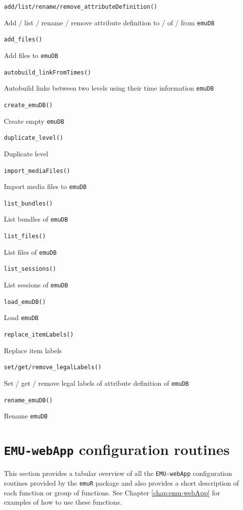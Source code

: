\documentclass[]{book}
\theoremstyle{definition}
\theoremstyle{definition}
\theoremstyle{definition}
\theoremstyle{remark}
\begin{document}
\texttt{add/list/rename/remove\_attributeDefinition()}

Add / list / rename / remove attribute definition to / of / from
\texttt{emuDB}

\texttt{add\_files()}

Add files to \texttt{emuDB}

\texttt{autobuild\_linkFromTimes()}

Autobuild links between two levels using their time information
\texttt{emuDB}

\texttt{create\_emuDB()}

Create empty \texttt{emuDB}

\texttt{duplicate\_level()}

Duplicate level

\texttt{import\_mediaFiles()}

Import media files to \texttt{emuDB}

\texttt{list\_bundles()}

List bundles of \texttt{emuDB}

\texttt{list\_files()}

List files of \texttt{emuDB}

\texttt{list\_sessions()}

List sessions of \texttt{emuDB}

\texttt{load\_emuDB()}

Load \texttt{emuDB}

\texttt{replace\_itemLabels()}

Replace item labels

\texttt{set/get/remove\_legalLabels()}

Set / get / remove legal labels of attribute definition of
\texttt{emuDB}

\texttt{rename\_emuDB()}

Rename \texttt{emuDB}

\hypertarget{sec:emuRpackageDetails-emuWebAppConfig}{%
\section{\texorpdfstring{\texttt{EMU-webApp} configuration
routines}{EMU-webApp configuration routines}}\label{sec:emuRpackageDetails-emuWebAppConfig}}

This section provides a tabular overview of all the \texttt{EMU-webApp}
configuration routines provided by the \texttt{emuR} package and also
provides a short description of each function or group of functions. See
Chapter \ref{chap:emu-webApp} for examples of how to use these
functions.
\end{document}

